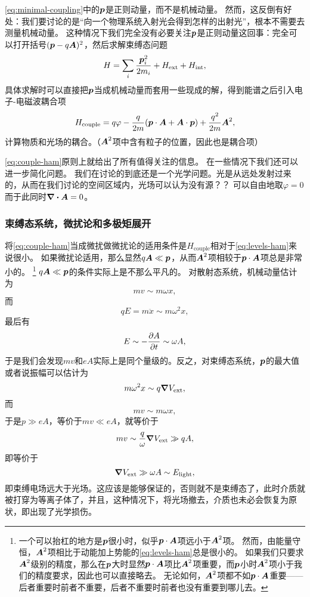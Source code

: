 \documentclass[UTF8, a4paper]{ctexart}
\begin{document}
\eqref{eq:minimal-coupling}中的$\vb*{p}$是正则动量，而不是机械动量。
然而，这反倒有好处：我们要讨论的是“向一个物理系统入射光会得到怎样的出射光”，根本不需要去测量机械动量。
这种情况下我们完全没有必要关注$\vb*{p}$是正则动量这回事：完全可以打开括号$(\vb*{p} - q \vb*{A})^2$，然后求解束缚态问题
\begin{equation}
    H = \sum_i \frac{\vb*{p}_i^2}{2m_i} + H_\text{ext} + H_\text{int},
    \label{eq:levels-ham}
\end{equation}
具体求解时可以直接把$\vb*{p}$当成机械动量而套用一些现成的解，得到能谱之后引入电子-电磁波耦合项
\begin{equation}
    H_\text{couple} = q \varphi - \frac{q}{2m} (\vb*{p} \cdot \vb*{A} + \vb*{A} \cdot \vb*{p}) + \frac{q^2}{2m} \vb*{A}^2,
    \label{eq:couple-ham}
\end{equation}
计算物质和光场的耦合。（$\vb*{A}^2$项中含有粒子的位置，因此也是耦合项）

\eqref{eq:couple-ham}原则上就给出了所有值得关注的信息。
在一些情况下我们还可以进一步简化问题。
我们在讨论的到底还是一个光学问题。光是从远处发射过来的，从而在我们讨论的空间区域内，光场可以认为没有源？？
可以自由地取$\varphi=0$而于此同时$\div{\vb*{A}}=0$。

\subsubsection{束缚态系统，微扰论和多极矩展开}

将\eqref{eq:couple-ham}当成微扰做微扰论的适用条件是$H_\text{couple}$相对于\eqref{eq:levels-ham}来说很小。
如果微扰论适用，那么显然$q \vb*{A} \ll \vb*{p}$，从而$\vb*{A}^2$项相较于$\vb*{p} \cdot \vb*{A}$项总是非常小的。%
\footnote{
    一个可以抬杠的地方是$\vb*{p}$很小时，似乎$\vb*{p} \cdot \vb*{A}$项远小于$\vb*{A}^2$项。
    然而，由能量守恒，$\vb*{A}^2$项相比于动能加上势能的\eqref{eq:levels-ham}总是很小的。
    如果我们只要求$\vb*{A}^2$级别的精度，那么在$\vb*{p}$大时显然$\vb*{p} \cdot \vb*{A}$项比$\vb*{A}^2$项重要，而$\vb*{p}$小时$\vb*{A}^2$项小于我们的精度要求，因此也可以直接略去。
    无论如何，$\vb*{A}^2$项都不如$\vb*{p} \cdot \vb*{A}$重要——后者重要时前者不重要，后者不重要时前者也没有重要到哪儿去。
}%
$q \vb*{A} \ll \vb*{p}$的条件实际上是不那么平凡的。
对散射态系统，机械动量估计为
\[
    m v \sim m \omega x,
\]
而
\[
    q E = m \ddot{x} \sim m \omega^2 x,
\]
最后有
\[
    E \sim - \pdv{A}{t} \sim \omega A,
\]
于是我们会发现$mv$和$eA$实际上是同个量级的。反之，对束缚态系统，$\vb*{p}$的最大值或者说振幅可以估计为
\[
    m \omega^2 x \sim q \grad{V_\text{ext}},
\]
而
\[
    mv \sim m \omega x,
\]
于是$p \gg eA$，等价于$mv \ll eA$，就等价于
\[
    mv \sim \frac{q}{\omega} \grad{V_\text{ext}} \gg q A,
\]
即等价于
\begin{equation}
    \grad{V_\text{ext}} \gg \omega A \sim E_\text{light},
\end{equation}
即束缚电场远大于光场。这应该是能够保证的，否则就不是束缚态了，此时介质就被打穿为等离子体了，并且，这种情况下，将光场撤去，介质也未必会恢复为原状，即出现了光学损伤。
\end{document}
